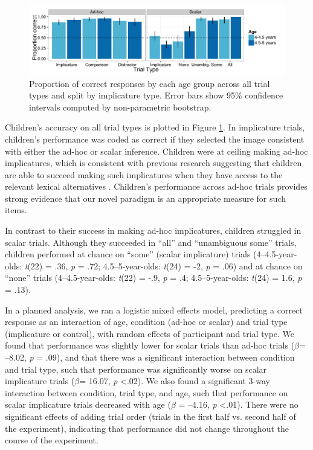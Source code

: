 \documentclass[man]{apa2}
\begin{document}
\begin{figure} 
 \begin{center} 
  \includegraphics[scale=.5]{figures/exp1_performance.pdf} 
  \caption{\label{fig:exp1_perf} Proportion of correct responses by each age group across all trial types and split by implicature type. Error bars show 95\% confidence intervals computed by non-parametric bootstrap.} 
 \end{center} 
\end{figure}

Children's accuracy on all trial types is plotted in Figure \ref{fig:exp1_perf}. In implicature trials, children's performance was coded as correct if they selected the image consistent with either the ad-hoc or scalar inference. Children were at ceiling making ad-hoc implicatures, which is consistent with previous research suggesting that children are able to succeed making such implicatures when they have access to the relevant lexical alternatives \cite{stiller2014}. Children's performance across ad-hoc trials provides strong evidence that our novel paradigm is an appropriate measure for such items.

In contrast to their success in making ad-hoc implicatures, children struggled in scalar trials. Although they succeeded in ``all'' and ``unambiguous some'' trials, children performed at chance on ``some'' (scalar implicature) trials (4--4.5-year-olds: \emph{t}(22) = .36, \emph{p} = .72; 4.5--5-year-olds: \emph{t}(24) = -2, \emph{p} =  .06) and at chance on ``none'' trials (4--4.5-year-olds: \emph{t}(22) = -.9, \emph{p} = .4; 4.5--5-year-olds: \emph{t}(24) = 1.6, \emph{p} = .13). 
	
In a planned analysis, we ran a logistic mixed effects model, predicting a correct response as an interaction of age, condition (ad-hoc or scalar) and trial type (implicature or control), with random effects of participant and trial type. We found that performance was slightly lower for scalar trials than ad-hoc trials ($\beta$= --8.02, \textit{p} = .09), and that there was a significant interaction between condition and trial type, such that performance was significantly worse on scalar implicature trials ($\beta$= 16.07, \textit{p} \textless  .02). We also found a significant 3-way interaction between condition, trial type, and age, such that performance on scalar implicature trials decreased with age ($\beta$ = --4.16, \textit{p} \textless  .01). There were no significant effects of adding trial order (trials in the first half vs. second half of the experiment), indicating that performance did not change throughout the course of the experiment. 
\end{document}
